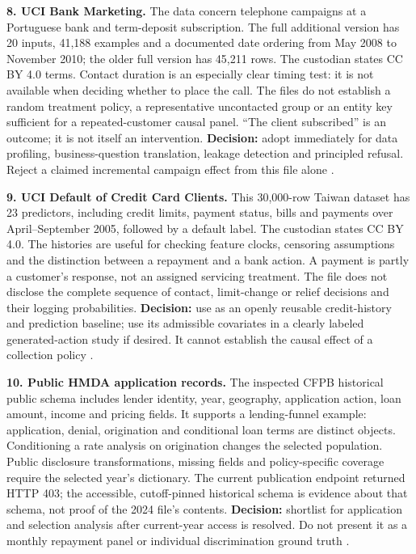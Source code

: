 \textbf{8. UCI Bank Marketing.} The data concern telephone campaigns at
a Portuguese bank and term-deposit subscription. The full additional
version has 20 inputs, 41,188 examples and a documented date ordering
from May 2008 to November 2010; the older full version has 45,211 rows.
The custodian states CC BY 4.0 terms. Contact duration is an especially
clear timing test: it is not available when deciding whether to place
the call. The files do not establish a random treatment policy, a
representative uncontacted group or an entity key sufficient for a
repeated-customer causal panel. ``The client subscribed'' is an outcome;
it is not itself an intervention. \textbf{Decision:} adopt immediately
for data profiling, business-question translation, leakage detection and
principled refusal. Reject a claimed incremental campaign effect from
this file alone \citep{pd15_uci_bank,pd15_profile}.

\textbf{9. UCI Default of Credit Card Clients.} This 30,000-row Taiwan
dataset has 23 predictors, including credit limits, payment status,
bills and payments over April--September 2005, followed by a default
label. The custodian states CC BY 4.0. The histories are useful for
checking feature clocks, censoring assumptions and the distinction
between a repayment and a bank action. A payment is partly a customer's
response, not an assigned servicing treatment. The file does not
disclose the complete sequence of contact, limit-change or relief
decisions and their logging probabilities. \textbf{Decision:} use as an
openly reusable credit-history and prediction baseline; use its
admissible covariates in a clearly labeled generated-action study if
desired. It cannot establish the causal effect of a collection policy
\citep{pd15_uci_credit}.

\textbf{10. Public HMDA application records.} The inspected CFPB
historical public schema includes lender identity, year, geography,
application action, loan amount, income and pricing fields. It supports
a lending-funnel example: application, denial, origination and
conditional loan terms are distinct objects. Conditioning a rate
analysis on origination changes the selected population. Public
disclosure transformations, missing fields and policy-specific coverage
require the selected year's dictionary. The current publication endpoint
returned HTTP 403; the accessible, cutoff-pinned historical schema is
evidence about that schema, not proof of the 2024 file's contents.
\textbf{Decision:} shortlist for application and selection analysis
after current-year access is resolved. Do not present it as a monthly
repayment panel or individual discrimination ground truth
\citep{pd15_hmda_schema}.

